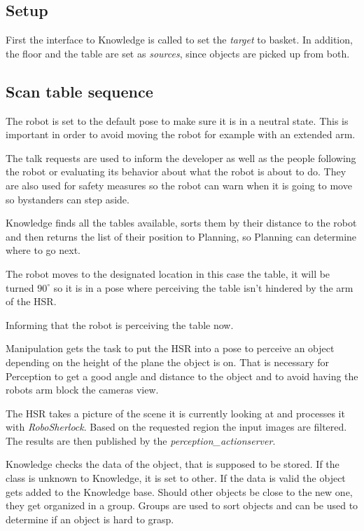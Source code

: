 \documentclass[main.tex]{subfiles}
\begin{document}
	\subsection{Setup}
	First the interface to Knowledge is called to set the \textit{target} to basket. In addition, the floor and the table are set as \textit{sources}, since objects are picked up from both. 

	\subsection{Scan table sequence}
	The robot is set to the default pose to make sure it is in a neutral state. This is important in order to avoid moving the robot for example with an extended arm.
	
	The talk requests are used to inform the developer as well as the people following the robot or evaluating its behavior about what the robot is about to do. They are also used for safety measures so the robot can warn when it is going to move so bystanders can step aside. 
	
	Knowledge finds all the tables available, sorts them by their distance to the robot and then returns the list of their position to Planning, so Planning can determine where to go next.
	
	The robot moves to the designated location in this case the table, it will be turned $90^\circ$ so it is in a pose where perceiving the table isn't hindered by the arm of the HSR. 
	
	Informing that the robot is perceiving the table now.
	
	Manipulation gets the task to put the HSR into a pose to perceive an object depending on the height of the plane the object is on.
    That is necessary for Perception to get a good angle and distance to the object and to avoid having the robots arm block the cameras view.
	
	The HSR takes a picture of the scene it is currently looking at and processes it with \textit{RoboSherlock}. Based on the requested region the input images are filtered. The results are then published by the \textit{perception\_actionserver}.

	
	Knowledge checks the data of the object, that is supposed to be stored. If the class is unknown to Knowledge, it is set to other. If the data is valid the object gets added to the Knowledge base. Should other objects be close to the new one, they get organized in a group. Groups are used to sort objects and can be used to determine if an object is hard to grasp.
	
\end{document}
